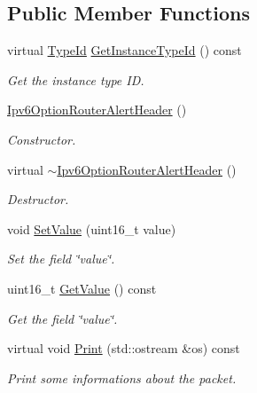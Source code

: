 \subsection*{Public Member Functions}
\begin{DoxyCompactItemize}
\item 
virtual \hyperlink{classns3_1_1TypeId}{Type\+Id} \hyperlink{classns3_1_1Ipv6OptionRouterAlertHeader_a62fade9361f43e4434b367f7cb6ecc23}{Get\+Instance\+Type\+Id} () const 
\begin{DoxyCompactList}\small\item\em Get the instance type ID. \end{DoxyCompactList}\item 
\hyperlink{classns3_1_1Ipv6OptionRouterAlertHeader_a069922a3e3f0fcad7e87664a17e3ba17}{Ipv6\+Option\+Router\+Alert\+Header} ()
\begin{DoxyCompactList}\small\item\em Constructor. \end{DoxyCompactList}\item 
virtual \hyperlink{classns3_1_1Ipv6OptionRouterAlertHeader_a2c21551b0e28a256705f311e79534c38}{$\sim$\+Ipv6\+Option\+Router\+Alert\+Header} ()
\begin{DoxyCompactList}\small\item\em Destructor. \end{DoxyCompactList}\item 
void \hyperlink{classns3_1_1Ipv6OptionRouterAlertHeader_a1499d853f26c5c5f37892b5fa4ea40b9}{Set\+Value} (uint16\+\_\+t value)
\begin{DoxyCompactList}\small\item\em Set the field \char`\"{}value\char`\"{}. \end{DoxyCompactList}\item 
uint16\+\_\+t \hyperlink{classns3_1_1Ipv6OptionRouterAlertHeader_a4a5a647304bbc0489410813bc66b1e72}{Get\+Value} () const 
\begin{DoxyCompactList}\small\item\em Get the field \char`\"{}value\char`\"{}. \end{DoxyCompactList}\item 
virtual void \hyperlink{classns3_1_1Ipv6OptionRouterAlertHeader_a344b0d9233ff1941c59e96ec0aaee639}{Print} (std\+::ostream \&os) const 
\begin{DoxyCompactList}\small\item\em Print some informations about the packet. \end{DoxyCompactList}\item 

\end{DoxyCompactItemize}
